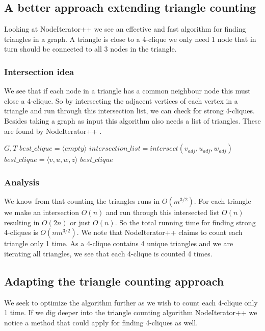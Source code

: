 \documentclass{article}
\begin{document}
\subsection{A better approach extending triangle counting}
Looking at NodeIterator++ \cite{countingTriangles} we see an effective and fast algorithm for finding triangles in a graph. A triangle is close to a 4-clique we only need 1 node that in turn should be connected to all 3 nodes in the triangle.

\subsubsection{Intersection idea}
We see that if each node in a triangle has a common neighbour node this must close a 4-clique. So by intersecting the adjacent vertices of each vertex in a triangle and run through this intersection list, we can check for strong 4-cliques. Besides taking a graph as input this algorithm also needs a list of triangles. These are found by NodeIterator++ \cite{countingTriangles}.

\begin{algorithm}
\caption{$strong\_4clique\_finder+$}
\begin{algorithmic}
\REQUIRE $G,T$
\STATE $best\_clique = \langle empty\rangle $
\STATE $intersection\_list = intersect(v_{adj}, u_{adj}, w_{adj})$
\STATE $best\_clique = \langle v,u,w,z\rangle $
\ENDIF
\ENDFOR
\ENDIF
\ENDFOR
\RETURN $best\_clique$
\end{algorithmic}
\end{algorithm}

\subsubsection{Analysis}
We know from \cite{countingTriangles} that counting the triangles runs in $O(m^{3/2})$. For each triangle we make an intersection $O(n)$ and run through this intersected list $O(n)$ resulting in $O(2n)$ or just $O(n)$. So the total running time for finding strong 4-cliques is $O(nm^{3/2})$. We note that NodeIterator++ claims to count each triangle only 1 time. As a 4-clique contains 4 unique triangles and we are iterating all triangles, we see that each 4-clique is counted 4 times.

\subsection{Adapting the triangle counting approach}
We seek to optimize the algorithm further as we wish to count each 4-clique only 1 time. If we dig deeper into the triangle counting algorithm NodeIterator++ \cite{countingTriangles} we notice a method that could apply for finding 4-cliques as well.
\end{document}
